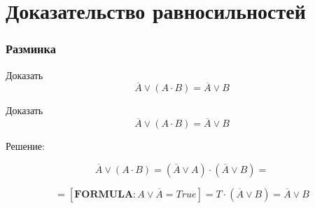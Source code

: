 \documentclass[10pt]{beamer}
\theoremstyle{remark}
\theoremstyle{definition}
\begin{document}
\section{Доказательство равносильностей}
\begin{frame}[allowframebreaks]
\frametitle{Разминка}

Доказать $$\overline{A} \vee (A \cdot B) = \overline{A} \vee B$$

\framebreak

Доказать $$\overline{A} \vee (A \cdot B) = \overline{A} \vee B$$


Решение:

 $$\overline{A} \vee (A \cdot B) = (\overline{A} \vee A) \cdot (\overline{A} \vee B) = $$
 
$$= [\boldsymbol{FORMULA} : A \vee \overline{A} = True] = T \cdot (\overline{A} \vee B) = \overline{A} \vee B $$
 

\end{frame}
\end{document}
